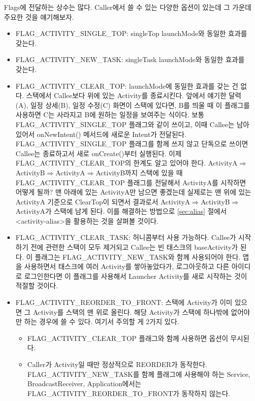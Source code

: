 Flags에 전달하는 상수는 많다. Caller에서 쓸 수 있는 다양한 옵션이 있는데 그 가운데 주요한 것을 얘기해보자.
\begin{itemize}
\item FLAG\_ACTIVITY\_SINGLE\_TOP: singleTop launchMode와 동일한 효과를 갖는다.

\item FLAG\_ACTIVITY\_NEW\_TASK: singleTask launchMode와 동일한 효과를 갖는다.

\item FLAG\_ACTIVITY\_CLEAR\_TOP: launchMode에 동일한 효과를 갖는 건 없다. 스택에서 Callee보다 위에 있는 Activity를 종료시킨다. 앞에서 얘기한 달력(A), 일정 상세(B), 일정 수정(C) 화면이 스택에 있다면, B를 띄울 때 이 플래그를 사용하면 C는 사라지고 B에 원하는 일정을 보여주는 식이다. 보통 FLAG\_ACTIVITY\_SINGLE\_TOP 플래그와 같이 쓰이고, 이때 Callee는 남아있어서 onNewIntent() 메서드에 새로운 Intent가 전달된다. FLAG\_ACTIVITY\_SINGLE\_TOP 플래그를 함께 쓰지 않고 단독으로 쓰이면 Callee는 종료하고서 새로 onCreate()부터 실행된다.
이제 FLAG\_ACTIVITY\_CLEAR\_TOP의 한계도 알고 있어야 한다. ActivityA$\Rightarrow$ActivityB$\Rightarrow$Activi\-tyA$\Rightarrow$ActivityB까지 스택에 있을 때 FLAG\_ACTI\-VITY\_CLEAR\_TOP 플래그를 전달해서 ActivityA를 시작하면 어떻게 될까? 맨 아래에 있는 ActivityA만 남으면 좋겠는데 실제로는 맨 위에 있는 ActivityA 기준으로 ClearTop이 되면서 결과로서 ActivityA$\Rightarrow$ActivityB$\Rightarrow$ActivityA가 스택에 남게 된다. 이를 해결하는 방법으로 \ref{sec:alias} 절에서 <activity-alias>을 활용하는 것을 살펴볼 것이다. 

\item FLAG\_ACTIVITY\_CLEAR\_TASK: 허니콤부터 사용 가능하다. Callee가 시작하기 전에 관련한 스택이 모두 제거되고 Callee는 빈 태스크의 baseActivity가 된다. 이 플래그는 FLAG\_ACTIVITY\_NEW\_TASK와 함께 사용되어야 한다. 앱을 사용하면서 태스크에 여러 Activity를 쌓아놓았다가, 로그아웃하고 다른 아이디로 로그인한다면 이 플래그를 사용해서 Launcher Activity를 새로 시작하는 것이 적절할 것이다.

\item FLAG\_ACTIVITY\_REORDER\_TO\_FRONT: 스택에 Activity가 이미 있으면 그 Activity를 스택의 맨 위로 올린다. 해당 Activity가 스택에 하나밖에 없어야만 하는 경우에 쓸 수 있다.
여기서 주의할 게 2가지 있다. 
\begin{itemize}
\item FLAG\_ACTIVITY\_CLEAR\_TOP 플래그와 함께 사용하면 옵션이 무시된다. 
\item Caller가 Activity일 때만 정상적으로 REORDER가 동작한다. FLAG\_ACTIVITY\_NEW\_TASK를 함께 플래그에 사용해야 하는 Service, BroadcastReceiver, Application에서는 FLAG\_ACTIVI\-TY\_RE\-ORDER\_TO\_FRONT가 동작하지 않는다.
\end{itemize}
\end{itemize}

